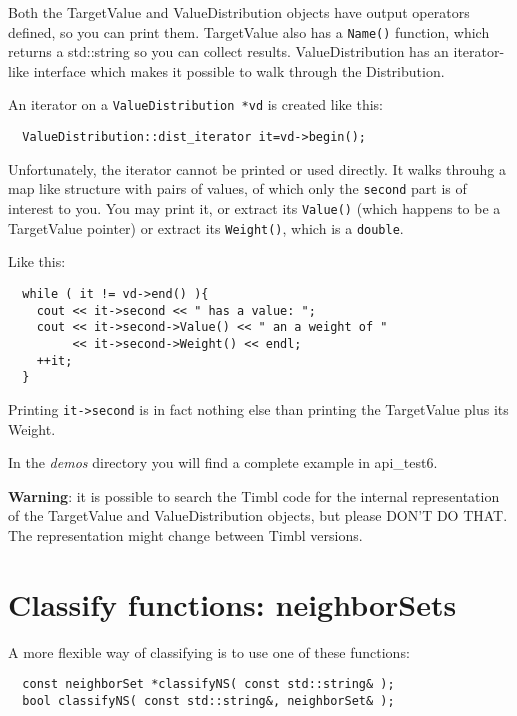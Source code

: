 \documentclass{report}
\begin{document}
Both the TargetValue and ValueDistribution objects have output
operators defined, so you can print them.
TargetValue also has a {\tt Name()} function, which returns a
std::string so you can collect results.
ValueDistribution has an iterator-like interface which makes it
possible to walk through the Distribution.

An iterator on a {\tt ValueDistribution *vd} is created like this:
\begin{footnotesize}
\begin{verbatim}
  ValueDistribution::dist_iterator it=vd->begin();
\end{verbatim}
\end{footnotesize}

Unfortunately, the iterator cannot be printed or used directly.
It walks throuhg a map like structure with pairs of values, of which
only the {\tt second} part is of interest to you.
You may print it, or extract its {\tt Value()} (which happens to be a
TargetValue pointer) or extract its {\tt Weight()}, which is a {\tt double}.

Like this:
\begin{footnotesize}
\begin{verbatim}
  while ( it != vd->end() ){
    cout << it->second << " has a value: ";
    cout << it->second->Value() << " an a weight of "
         << it->second->Weight() << endl;
    ++it;
  }
\end{verbatim}
\end{footnotesize}
Printing {\tt it->second} is in fact nothing else than printing the
TargetValue plus its Weight.

In the {\em demos}\/ directory you will find a complete example in api\_test6.

{\bf Warning}: it is possible to search the Timbl code for the
internal representation of the TargetValue and ValueDistribution
objects, but please DON'T DO THAT.  The representation might change
between Timbl versions.

\section{Classify functions: neighborSets}

A more flexible way of classifying is to use one of these functions:

\begin{footnotesize}
\begin{verbatim}
  const neighborSet *classifyNS( const std::string& );
  bool classifyNS( const std::string&, neighborSet& );
\end{verbatim}
\end{footnotesize}
\end{document}
